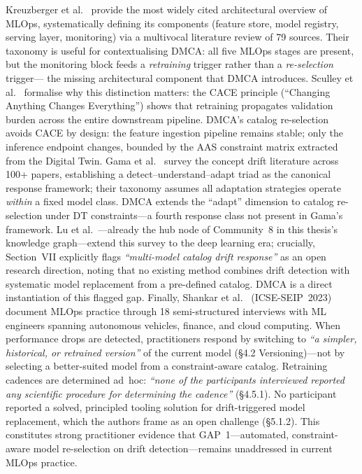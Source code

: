 Kreuzberger et al.~\cite{kreuzberger2023mlops} provide the most
widely cited architectural overview of MLOps, systematically
defining its components (feature store, model registry, serving
layer, monitoring) via a multivocal literature review of 79 sources.
Their taxonomy is useful for contextualising DMCA: all five MLOps
stages are present, but the monitoring block feeds a
\emph{retraining} trigger rather than a \emph{re-selection} trigger—
the missing architectural component that DMCA introduces.
Sculley et al.~\cite{sculley2015debt} formalise why this distinction
matters: the CACE principle (``Changing Anything Changes
Everything'') shows that retraining propagates validation burden
across the entire downstream pipeline.
DMCA's catalog re-selection avoids CACE by design: the feature
ingestion pipeline remains stable; only the inference endpoint
changes, bounded by the AAS constraint matrix extracted from the
Digital Twin.
Gama et al.~\cite{gama2014survey} survey the concept drift
literature across 100+ papers, establishing a detect--understand--adapt
triad as the canonical response framework; their taxonomy assumes
all adaptation strategies operate \emph{within} a fixed model class.
DMCA extends the ``adapt'' dimension to catalog re-selection under
DT constraints—a fourth response class not present in Gama's framework.
Lu et al.~\cite{lu2020drift}---already the hub node of Community~8
in this thesis's knowledge graph---extend this survey to the deep
learning era; crucially, Section~VII explicitly flags
\emph{``multi-model catalog drift response''} as an open research
direction, noting that no existing method combines drift detection
with systematic model replacement from a pre-defined catalog.
DMCA is a direct instantiation of this flagged gap.
Finally, Shankar et al.~\cite{shankar2022operationalizing} (ICSE-SEIP~2023)
document MLOps practice through 18 semi-structured interviews with
ML engineers spanning autonomous vehicles, finance, and cloud
computing. When performance drops are detected, practitioners
respond by switching to \emph{``a simpler, historical, or retrained
version''} of the current model (§4.2 Versioning)---not by selecting
a better-suited model from a constraint-aware catalog.
Retraining cadences are determined ad~hoc: \emph{``none of the
participants interviewed reported any scientific procedure for
determining the cadence''} (§4.5.1). No participant reported a
solved, principled tooling solution for drift-triggered model
replacement, which the authors frame as an open challenge (§5.1.2).
This constitutes strong practitioner evidence that GAP~1---automated,
constraint-aware model re-selection on drift detection---remains
unaddressed in current MLOps practice.

